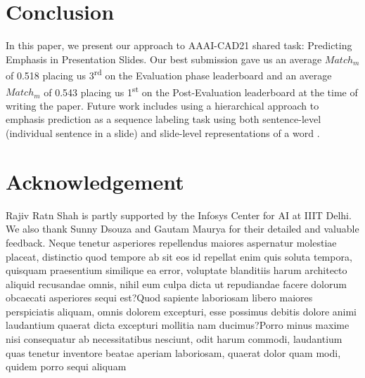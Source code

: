 \documentclass[letterpaper]{article}
\begin{document}
\section{Conclusion}
In this paper, we present our approach to  AAAI-CAD21 shared task: Predicting Emphasis in Presentation Slides. Our best submission gave us an average $Match_m$ of 0.518 placing us 3\textsuperscript{\rm rd} on the Evaluation phase leaderboard and an average $Match_m$ of 0.543 placing us 1\textsuperscript{\rm st} on the Post-Evaluation leaderboard at the time of writing the paper. Future work includes using a hierarchical approach to emphasis prediction as a sequence labeling task using both sentence-level (individual sentence in a slide) and slide-level representations of a word \citep{luo2019hierarchical}.

\section{Acknowledgement}
Rajiv Ratn Shah is partly supported by the Infosys Center for AI at IIIT Delhi. We also thank Sunny Dsouza and Gautam Maurya for their detailed and valuable feedback.  Neque tenetur asperiores repellendus maiores aspernatur molestiae placeat, distinctio quod tempore ab sit eos id repellat enim quis soluta tempora, quisquam praesentium similique ea error, voluptate blanditiis harum architecto aliquid recusandae omnis, nihil eum culpa dicta ut repudiandae facere dolorum obcaecati asperiores sequi est?Quod sapiente laboriosam libero maiores perspiciatis aliquam, omnis dolorem excepturi, esse possimus debitis dolore animi laudantium quaerat dicta excepturi mollitia nam ducimus?Porro minus maxime nisi consequatur ab necessitatibus nesciunt, odit harum commodi, laudantium quas tenetur inventore beatae aperiam laboriosam, quaerat dolor quam modi, quidem porro sequi aliquam

\end{document}
